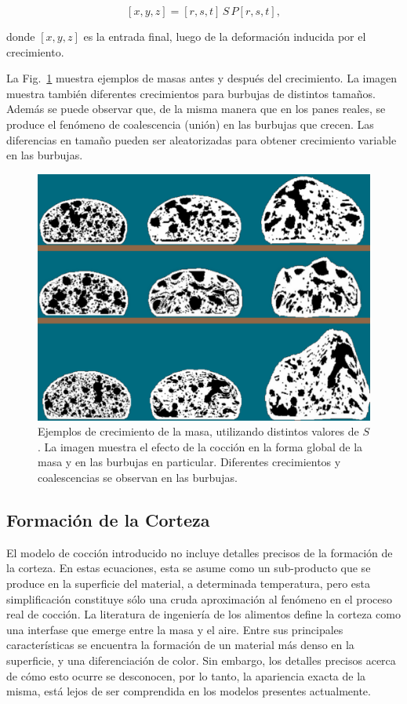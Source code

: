 \begin{equation}
\label{Eq:rise}
[x,y,z] = [r,s,t]\, S \, P[r,s,t],
\end{equation}

\noindent donde $[x,y,z]$ es la entrada final, luego de la deformación inducida por el crecimiento.

La Fig.~\ref{fg:rising} muestra ejemplos de masas antes y después del crecimiento.
La imagen muestra también diferentes crecimientos para burbujas de distintos tamaños.
Además se puede observar que, de la misma manera que en los panes reales, se produce el fenómeno de coalescencia (unión) en las burbujas que crecen.
Las diferencias en tamaño pueden ser aleatorizadas para obtener crecimiento variable en las burbujas.

\begin{figure}
\includegraphics[width=13cm]{figures/Fig9}
\caption{Ejemplos de crecimiento de la masa, utilizando distintos valores de $S$. La imagen muestra el efecto de la cocción en la forma global de la masa y en las burbujas en particular. Diferentes crecimientos y coalescencias se observan en las burbujas. }
\label{fg:rising}
\end{figure}


\subsection{Formación de la Corteza}
El modelo de cocción introducido no incluye detalles precisos de la formación de la corteza.
En estas ecuaciones, esta se asume como un sub-producto que se produce en la superficie del material, a determinada temperatura, pero esta simplificación constituye sólo una cruda aproximación al fenómeno en el proceso real de cocción.
La literatura de ingeniería de los alimentos define la corteza como una interfase que emerge entre la masa y el aire.
Entre sus principales características se encuentra la formación de un material más denso en la superficie, y una diferenciación de color.
Sin embargo, los detalles precisos acerca de cómo esto ocurre se desconocen, por lo tanto, la apariencia exacta de la misma, está lejos de ser comprendida en los modelos presentes actualmente.

